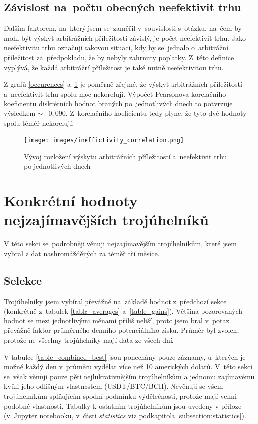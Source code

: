 \documentclass[thesis=B,czech]{FITthesis}[2019/03/21]
\begin{document}
\subsection{Závislost na~počtu obecných neefektivit trhu}
Dalším faktorem, na~který jsem se~zaměřil v~souvislosti s~otázku, na~čem by mohl být výskyt arbitrážních příležitostí závislý, je počet neefektivit trhu. Jako neefektivitu trhu označuji takovou situaci, kdy by se~jednalo o~arbitrážní příležitost za~předpokladu, že by nebyly zahrnuty poplatky. Z~této definice vyplývá, že každá arbitrážní příležitost je také nutně neefektivitou trhu.

Z grafů \ref{occurences} a~\ref{ineffictivity_correlation} je poměrně zřejmé, že výskyt arbitrážních příležitostí a~neefektivit trhu spolu moc nekorelují. Výpočet Pearsonova korelačního koeficientu diskrétních hodnot braných po~jednotlivých dnech to potvrzuje výsledkem \(\sim-0,090\). Z~korelačního koeficientu tedy plyne, že tyto dvě hodnoty spolu téměř nekorelují.

\begin{figure}\centering
	\texttt{[image: images/ineffictivity\_correlation.png]}
	\caption{Vývoj rozložení výskytu arbitrážních příležitostí a~neefektivit trhu po jednotlivých dnech}
	\label{ineffictivity_correlation}
\end{figure}

\section{Konkrétní hodnoty nejzajímavějších trojúhelníků}
V této sekci se~podrobněji věnuji nejzajímavějším trojúhelníkům, které jsem vybral z dat nashromážděných za téměř tří měsíce. 

\subsection{Selekce}
Trojúhelníky jsem vybíral převážně na~základě hodnot z~předchozí sekce \linebreak (konkrétně z~tabulek \ref{table_averages} a~\ref{table_gains}). Většina pozorovaných hodnot se mezi jednotlivými měnami příliš neliší, proto jsem bral v~potaz převážně faktor průměrného denního potenciálního zisku. Průměr byl zvolen, protože ne všechny trojúhelníky mají data ze všech dní.

V tabulce \ref{table_combined_best} jsou ponechány pouze záznamy, u~kterých je možné každý den v~průměru vydělat více než 10 amerických dolarů. V~této sekci se~však věnuji pouze pěti nejlukrativnějším trojúhelníkům a jednomu zajímavému kvůli jeho odlišným vlastnostem (USDT/BTC/BCH). Nevěnuji se všem trojúhelníkům splňujícím spodní podmínku výdělečnosti, protože mají velmi podobné vlastnosti. Tabulky k ostatním trojúhelníkům jsou uvedeny v příloze (v~Jupyter notebooku, v~části \textit{statistics} viz podkapitola \ref{subsection:statistics}).
\end{document}
